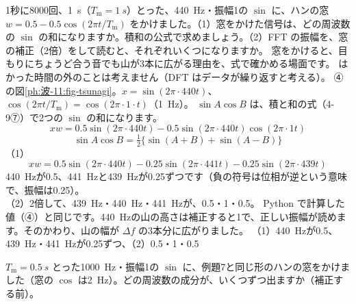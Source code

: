\label{ph:波-11:ex7}
\begin{phreidai}[ハンの窓をかけた音の成分]
1秒に8000回、\qty{1}{s}（$T_{\mathrm m}=\qty{1}{s}$）とった、\qty{440}{Hz}・振幅1の $\sin$ に、ハンの窓 $w=0.5-0.5\cos(2\pi t/T_{\mathrm m})$ をかけました。（1）窓をかけた信号は、どの周波数の $\sin$ の和になりますか。積和の公式で求めましょう。（2）FFT の振幅を、窓の補正（2倍）をして読むと、それぞれいくつになりますか。
\phbamen
窓をかけると、目もりにちょうど合う音でも山が3本に広がる理由を、式で確かめる場面です。
\phmushi
はかった時間の外のことは考えません（DFT はデータが繰り返すと考える）。
\phzu
④の図\ref{ph:波-11:fig-tsunagi}。$x=\sin(2\pi\cdot440t)$、$\cos(2\pi t/T_{\mathrm m})=\cos(2\pi\cdot1\cdot t)$（\qty{1}{Hz}）。
\phriyu
$\sin A\cos B$ は、積と和の式（4-9⑦）で2つの $\sin$ の和になります。
\phtateru
\[xw=0.5\sin(2\pi\cdot440t)-0.5\sin(2\pi\cdot440t)\cos(2\pi\cdot1t)\]
\[\sin A\cos B=\tfrac12\{\sin(A+B)+\sin(A-B)\}\]
\phtoku
（1）\[xw=0.5\sin(2\pi\cdot440t)-0.25\sin(2\pi\cdot441t)-0.25\sin(2\pi\cdot439t)\]
\qty{440}{Hz}が0.5、\qty{441}{Hz}と\qty{439}{Hz}が0.25ずつです（負の符号は位相が逆という意味で、振幅は0.25）。\\
（2）2倍して、\qty{439}{Hz}・\qty{440}{Hz}・\qty{441}{Hz}が、0.5・1・0.5。
\phtashikame
Python で計算した値（④）と同じです。\qty{440}{Hz}の山の高さは補正すると1で、正しい振幅が読めます。そのかわり、山の幅が $\Delta f$ の3本分に広がりました。
\kotae （1）\qty{440}{Hz}が0.5、\qty{439}{Hz}・\qty{441}{Hz}が0.25ずつ、（2）0.5・1・0.5
\end{phreidai}
\begin{jibun}
$T_{\mathrm m}=\qty{0.5}{s}$ とった\qty{1000}{Hz}・振幅1の $\sin$ に、例題7と同じ形のハンの窓をかけました（窓の $\cos$ は\qty{2}{Hz}）。どの周波数の成分が、いくつずつ出ますか（補正する前）。
\end{jibun}

